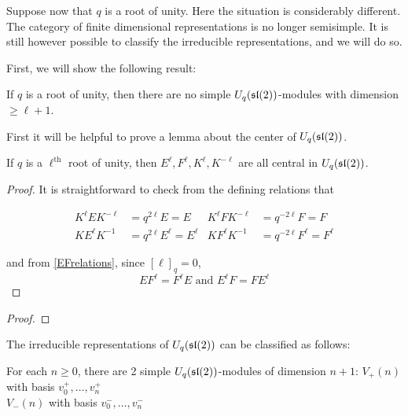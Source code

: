 
Suppose now that $q$ is a root of unity. Here the situation is considerably
different. The category of finite dimensional representations is no longer
semisimple. It is still however possible to classify the irreducible representations,
and we will do so. 

First, we will show the following result:

\begin{theorem}
If $q$ is a root of unity, then there are no simple $U_q(\mathfrak{sl}(2))$-modules
with dimension $\geq \ell+1$. 
\end{theorem}

First it will be helpful to prove a lemma about the center of $U_q(\mathfrak{sl}(2))$.

\begin{lemma}
    If $q$ is a $\ell^\text{th}$ root of unity, then $E^\ell, F^\ell, K^\ell,
    K^{-\ell}$ are all central in $U_q(\mathfrak{sl}(2))$.
\end{lemma}
\begin{proof}
    It is straightforward to check from the defining relations that 

    \begin{align}
        K^\ell E K^{-\ell} &= q^{2\ell}E = E  & K^{\ell}FK^{-\ell} &= q^{-2\ell}F = F\\
        K E^\ell K^{-1} &= q^{2\ell}E^\ell = E^\ell  & KF^\ell K^{-1} &= q^{-2\ell}F^\ell = F^\ell
    \end{align}
    
    and from \ref{EFrelations}, since $[\ell]_q = 0$, 
    \begin{equation}
        EF^\ell = F^\ell E \text{ and } E^\ell F = FE^\ell
    \end{equation}

\end{proof}
\begin{proof}
\end{proof}

The irreducible representations of
$U_q(\mathfrak{sl}(2))$ can be classified as follows: 

For each $n\geq 0$, there are 2 simple $U_q(\mathfrak{sl}(2))$-modules of dimension $n+1$: 
$V_+(n)$ with basis $v^+_0, \ldots, v^+_n$ \\
$V_-(n)$ with basis $v^-_0, \ldots, v^-_n$


